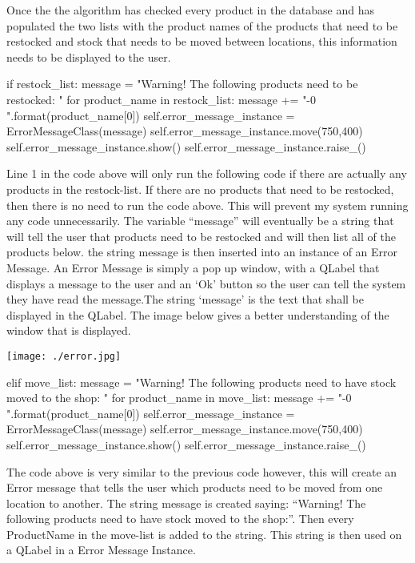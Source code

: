 \begin{python}
Once the the algorithm has checked every product in the database and has populated the two lists with the product names of the products that need to be restocked and stock that needs to be moved between locations, this information needs to be displayed to the user.

\begin{python}
if restock_list:
            message = "Warning! \n \n The following products need to be restocked: \n \n "
            for product_name in restock_list:
                message += "-{0} \n".format(product_name[0])
            self.error_message_instance = ErrorMessageClass(message)
            self.error_message_instance.move(750,400)
            self.error_message_instance.show()
            self.error_message_instance.raise_()
\end{python}

Line 1 in the code above will only run the following code if there are actually any products in the restock-list. If there are no products that need to be restocked, then there is no need to run the code above. This will prevent my system running any code unnecessarily. The variable ``message'' will eventually be a string that will tell the user that products need to be restocked and will then list all of the products below. the string message is then inserted into an instance of an Error Message. An Error Message is simply a pop up window, with a QLabel that displays a message to the user and an `Ok' button so the user can tell the system they have read the message.The string `message' is the text that shall be displayed in the QLabel. The image below gives a better understanding of the window that is displayed.

\texttt{[image: ./error.jpg]}
\label{fig:move-stock-message}

\begin{python}
elif move_list:
            message = "Warning! \n \n The following products need to have stock moved to the shop: \n \n"
            for product_name in move_list:
                message += "-{0} \n".format(product_name[0])
            self.error_message_instance = ErrorMessageClass(message)
            self.error_message_instance.move(750,400)
            self.error_message_instance.show()
            self.error_message_instance.raise_()
\end{python}

The code above is very similar to the previous code however, this will create an Error message that tells the user which products need to be moved from one location to another. The string message is created saying: ``Warning! The following products need to have stock moved to the shop:''. Then every ProductName in the move-list is added to the string. This string is then used on a QLabel in a Error Message Instance.


\end{python}
